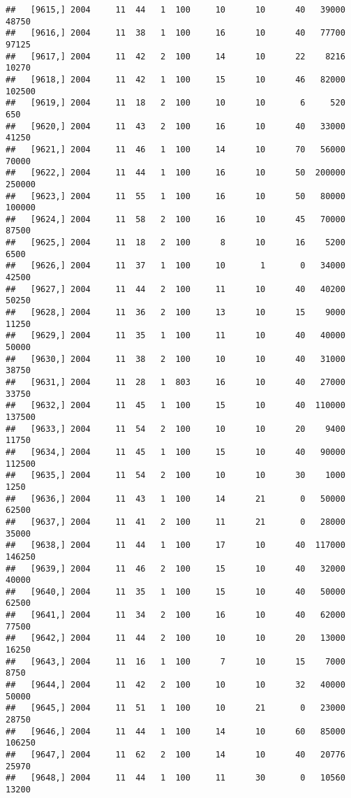 \documentclass{article}\usepackage[]{graphicx}\usepackage[]{color}
\makeatletter
\newenvironment{kframe}{%
 \def\at@end@of@kframe{}%
 \ifinner\ifhmode%
  \def\at@end@of@kframe{\end{minipage}}%
  \begin{minipage}{\columnwidth}%
 \fi\fi%
 \def\FrameCommand##1{\hskip\@totalleftmargin \hskip-\fboxsep
 \colorbox{shadecolor}{##1}\hskip-\fboxsep
     \hskip-\linewidth \hskip-\@totalleftmargin \hskip\columnwidth}%
 \MakeFramed {\advance\hsize-\width
   \@totalleftmargin\z@ \linewidth\hsize
   \@setminipage}}%
 {\par\unskip\endMakeFramed%
 \at@end@of@kframe}
\newenvironment{knitrout}{}{} %
\makeatother
\begin{document}
\begin{knitrout}
\begin{kframe}
\begin{verbatim}
##   [9615,] 2004     11  44   1  100     10      10      40   39000   48750
##   [9616,] 2004     11  38   1  100     16      10      40   77700   97125
##   [9617,] 2004     11  42   2  100     14      10      22    8216   10270
##   [9618,] 2004     11  42   1  100     15      10      46   82000  102500
##   [9619,] 2004     11  18   2  100     10      10       6     520     650
##   [9620,] 2004     11  43   2  100     16      10      40   33000   41250
##   [9621,] 2004     11  46   1  100     14      10      70   56000   70000
##   [9622,] 2004     11  44   1  100     16      10      50  200000  250000
##   [9623,] 2004     11  55   1  100     16      10      50   80000  100000
##   [9624,] 2004     11  58   2  100     16      10      45   70000   87500
##   [9625,] 2004     11  18   2  100      8      10      16    5200    6500
##   [9626,] 2004     11  37   1  100     10       1       0   34000   42500
##   [9627,] 2004     11  44   2  100     11      10      40   40200   50250
##   [9628,] 2004     11  36   2  100     13      10      15    9000   11250
##   [9629,] 2004     11  35   1  100     11      10      40   40000   50000
##   [9630,] 2004     11  38   2  100     10      10      40   31000   38750
##   [9631,] 2004     11  28   1  803     16      10      40   27000   33750
##   [9632,] 2004     11  45   1  100     15      10      40  110000  137500
##   [9633,] 2004     11  54   2  100     10      10      20    9400   11750
##   [9634,] 2004     11  45   1  100     15      10      40   90000  112500
##   [9635,] 2004     11  54   2  100     10      10      30    1000    1250
##   [9636,] 2004     11  43   1  100     14      21       0   50000   62500
##   [9637,] 2004     11  41   2  100     11      21       0   28000   35000
##   [9638,] 2004     11  44   1  100     17      10      40  117000  146250
##   [9639,] 2004     11  46   2  100     15      10      40   32000   40000
##   [9640,] 2004     11  35   1  100     15      10      40   50000   62500
##   [9641,] 2004     11  34   2  100     16      10      40   62000   77500
##   [9642,] 2004     11  44   2  100     10      10      20   13000   16250
##   [9643,] 2004     11  16   1  100      7      10      15    7000    8750
##   [9644,] 2004     11  42   2  100     10      10      32   40000   50000
##   [9645,] 2004     11  51   1  100     10      21       0   23000   28750
##   [9646,] 2004     11  44   1  100     14      10      60   85000  106250
##   [9647,] 2004     11  62   2  100     14      10      40   20776   25970
##   [9648,] 2004     11  44   1  100     11      30       0   10560   13200

\end{verbatim}
\end{kframe}
\end{knitrout}
\end{document}
